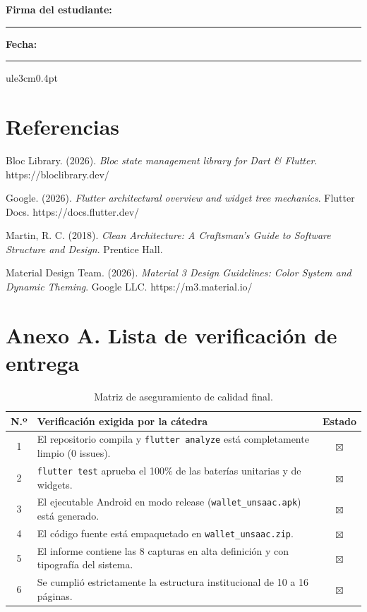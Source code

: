 \documentclass[12pt,a4paper]{article}
\begin{document}
\vspace{1.0cm}
\noindent\textbf{Firma del estudiante:} \rule{7cm}{0.4pt} \qquad \textbf{Fecha:} \rule{3cm}{0.4pt}
ule{3cm}{0.4pt}

\section{Referencias}

\begin{enumerate}[label={[\arabic*]},itemsep=2pt]
    \item Bloc Library. (2026). \textit{Bloc state management library for Dart \& Flutter}. https://bloclibrary.dev/
    \item Google. (2026). \textit{Flutter architectural overview and widget tree mechanics}. Flutter Docs. https://docs.flutter.dev/
    \item Martin, R. C. (2018). \textit{Clean Architecture: A Craftsman's Guide to Software Structure and Design}. Prentice Hall.
    \item Material Design Team. (2026). \textit{Material 3 Design Guidelines: Color System and Dynamic Theming}. Google LLC. https://m3.material.io/
\end{enumerate}

\newpage
\section*{Anexo A. Lista de verificación de entrega}

\begin{table}[h!]
\centering
\begin{tabular}{@{}clc@{}}
\toprule
\textbf{N.º} & \textbf{Verificación exigida por la cátedra} & \textbf{Estado} \\
\midrule
1 & El repositorio compila y \texttt{flutter analyze} está completamente limpio (0 issues). & $\boxtimes$ \\
2 & \texttt{flutter test} aprueba el 100\% de las baterías unitarias y de widgets. & $\boxtimes$ \\
3 & El ejecutable Android en modo release (\texttt{wallet\_unsaac.apk}) está generado. & $\boxtimes$ \\
4 & El código fuente está empaquetado en \texttt{wallet\_unsaac.zip}. & $\boxtimes$ \\
5 & El informe contiene las 8 capturas en alta definición y con tipografía del sistema. & $\boxtimes$ \\
6 & Se cumplió estrictamente la estructura institucional de 10 a 16 páginas. & $\boxtimes$ \\
\bottomrule
\end{tabular}
\caption{Matriz de aseguramiento de calidad final.}
\end{table}
\end{document}
